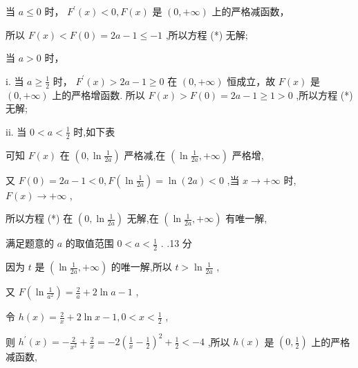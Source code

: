 \documentclass[10pt]{article}
\newcommand*\circled[1]{\tikz[baseline=(char.base)]{\node[shape=circle,draw,inner sep=1.5pt] (char) {\small #1};}}
\begin{document}
 \circled{1}  当 \(a \leq  0\) 时， \({F}^{\prime }\left( x\right)  < 0,F\left( x\right)\) 是 \(\left( {0, + \infty }\right)\) 上的严格减函数，

所以 \(F\left( x\right)  < F\left( 0\right)  = {2a} - 1 \leq   - 1\) ,所以方程 (*) 无解;

 \circled{2}  当 \(a > 0\) 时，

i. 当 \(a \geq  \frac{1}{2}\) 时， \({F}^{\prime }\left( x\right)  > {2a} - 1 \geq  0\) 在 \(\left( {0, + \infty }\right)\) 恒成立，故 \(F\left( x\right)\) 是 \(\left( {0, + \infty }\right)\) 上的严格增函数. 所以 \(F\left( x\right)  > F\left( 0\right)  = {2a} - 1 \geq  1 > 0\) ,所以方程 (*) 无解;

ii. 当 \(0 < a < \frac{1}{2}\) 时,如下表

\begin{center}
\end{center}

可知 \(F\left( x\right)\) 在 \(\left( {0,\ln \frac{1}{2a}}\right)\) 严格减,在 \(\left( {\ln \frac{1}{2a}, + \infty }\right)\) 严格增,

又 \(F\left( 0\right)  = {2a} - 1 < 0,F\left( {\ln \frac{1}{2a}}\right)  = \ln \left( {2a}\right)  < 0\) ,当 \(x \rightarrow   + \infty\) 时, \(F\left( x\right)  \rightarrow   + \infty\) ,

所以方程 (*) 在 \(\left( {0,\ln \frac{1}{2a}}\right)\) 无解,在 \(\left( {\ln \frac{1}{2a}, + \infty }\right)\) 有唯一解,

满足题意的 \(a\) 的取值范围 \(0 < a < \frac{1}{2}\) . .13 分

因为 \(t\) 是 \(\left( {\ln \frac{1}{2a}, + \infty }\right)\) 的唯一解,所以 \(t > \ln \frac{1}{2a}\) ,

又 \(F\left( {\ln \frac{1}{{a}^{2}}}\right)  = \frac{2}{a} + 2\ln a - 1\) ,

令 \(h\left( x\right)  = \frac{2}{x} + 2\ln x - 1,0 < x < \frac{1}{2}\) ,

则 \({h}^{\prime }\left( x\right)  =  - \frac{2}{{x}^{2}} + \frac{2}{x} =  - 2{\left( \frac{1}{x} - \frac{1}{2}\right) }^{2} + \frac{1}{2} <  - 4\) ,所以 \(h\left( x\right)\) 是 \(\left( {0,\frac{1}{2}}\right)\) 上的严格减函数,
\end{document}
